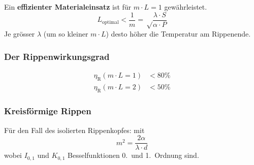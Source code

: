 			Ein \textbf{effizienter Materialeinsatz} ist für $m\cdot L = 1$ gewähr\-leistet.
			\[
				L_\text{optimal} < \frac{1}{m} = \sqrt \frac{\lambda \cdot S}{\alpha \cdot P}
			\]
			Je grösser $\lambda$ (um so kleiner $m\cdot L$) desto höher die Temperatur am Rippenende.

		\subsubsection{Der Rippenwirkungsgrad} %
			\begin{align*}
				\eta_\text{R}(m\cdot L = 1) &< 80\% \\
				\eta_\text{R}(m\cdot L = 2) &< 50\%
			\end{align*}

		\subsubsection{Kreisförmige Rippen} %
			Für den Fall des isolierten Rippenkopfes:
			mit \[
				m^2 = \frac{2\alpha}{\lambda \cdot d}
			\]
			wobei $I_{0,1}$ und $K_{0,1}$ Besselfunktionen 0.~und 1.~Ordnung sind.
